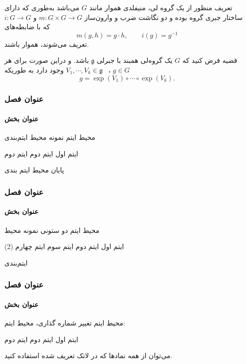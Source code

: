 \documentclass{beamer}
\begin{document}
\begin{frame}
\frametitle{}
\framesubtitle{}
\begin{block}{تعریف}
منظور از یک گروه لی، منیفلدی هموار مانند
$ G $
می‌باشد به‌طوری که دارای ساختار جبری گروه بوده و دو نگاشت ضرب و وارون‌ساز 
$ m:G\times G \longrightarrow G $
و
$ i:G \longrightarrow G $
که با ضابطه‌های
\begin{equation}
m\left( g,h\right) =g\cdot h, \qquad i(g)=g^{-1}
\end{equation}
تعریف می‌شوند، هموار باشند.
\end{block}
\begin{block}{قضیه}
فرض کنید که 
$ G $ 
یک گروه‌لی همبند با جبرلی 
$ \mathfrak{g} $
باشد. و دراین‌ صورت برای هر 
$ g \in G $
، \,
$ V_{1},\cdots,V_{k}\in \mathfrak{g} $
وجود دارد به طوریکه
\begin{equation*}
g=\exp(V_{1})\circ \cdots \circ \exp (V_{k}).
\end{equation*}
\end{block}	
\end{frame}




\begin{frame}
\frametitle{عنوان فصل }
\framesubtitle{عنوان بخش}
\begin{block}{محیط ایتم}
\justifying	
نمونه محیط ایتم‌بندی
\begin{tasks}
\task[1.]
 ایتم اول
\task[2.] 
ایتم دوم
\task[3.] 
ایتم دوم
\end{tasks}
پایان محیط ایتم بندی
\end{block}	
\end{frame}




\begin{frame}
\frametitle{عنوان فصل }
\framesubtitle{عنوان بخش}
\begin{block}{محیط ایتم دو ستونی}
\justifying	
نمونه محیط 
\begin{tasks}(2)
\task[1.]
 ایتم اول
\task[2.]  
ایتم دوم
\task[3.]
ایتم سوم
\task[4.]
ایتم چهارم
\end{tasks}
ایتم‌بندی
\end{block}	
\end{frame}







\begin{frame}
\frametitle{عنوان فصل }
\framesubtitle{عنوان بخش}
\begin{block}{محیط ایتم}
\justifying	
تغییر شماره گذاری، محیط ایتم:
\begin{tasks}
\task[\ding{182}]
 ایتم اول
\task[\ding{173}]  
ایتم دوم
\task[$\bullet$]
ایتم دوم
\end{tasks}
می‌توان از همه نمادها که در لاتک تعریف شده استفاده کنید.
\end{block}	
\end{frame}
\end{document}

